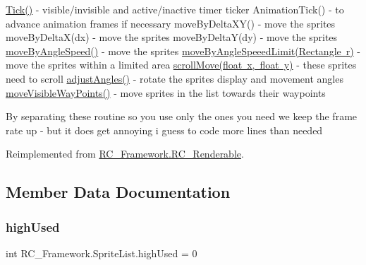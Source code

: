 \mbox{\hyperlink{class_r_c___framework_1_1_sprite_list_af36a07386a5b0f32a74473890868b3fc}{Tick()}} -\/ visible/invisible and active/inactive timer ticker Animation\+Tick() -\/ to advance animation frames if necessary move\+By\+Delta\+X\+Y() -\/ move the sprites move\+By\+Delta\+X(dx) -\/ move the sprites move\+By\+Delta\+Y(dy) -\/ move the sprites \mbox{\hyperlink{class_r_c___framework_1_1_sprite_list_a5467136da9d231b4e99444adb5f52470}{move\+By\+Angle\+Speed()}} -\/ move the sprites \mbox{\hyperlink{class_r_c___framework_1_1_sprite_list_a1ad88a094e1efbdd75de18f8f1d49db1}{move\+By\+Angle\+Speeed\+Limit(\+Rectangle r)}} -\/ move the sprites within a limited area \mbox{\hyperlink{class_r_c___framework_1_1_sprite_list_ac4dbeb822b300bdcbebeb20c15b7bc9a}{scroll\+Move(float x, float y)}} -\/ these sprites need to scroll \mbox{\hyperlink{class_r_c___framework_1_1_sprite_list_a91c1c36f7a1b321e6a1351fddd9c7e3e}{adjust\+Angles()}} -\/ rotate the sprites display and movement angles \mbox{\hyperlink{class_r_c___framework_1_1_sprite_list_a2f4c60ffbdb1ed918079bb2572b0dcf5}{move\+Visible\+Way\+Points()}} -\/ move sprites in the list towards their waypoints

By separating these routine so you use only the ones you need we keep the frame rate up -\/ but it does get annoying i guess to code more lines than needed

Reimplemented from \mbox{\hyperlink{class_r_c___framework_1_1_r_c___renderable_a5745bedc7ba0587aa1e1d8563c357228}{R\+C\+\_\+\+Framework.\+R\+C\+\_\+\+Renderable}}.



\subsection{Member Data Documentation}
\mbox{\label{class_r_c___framework_1_1_sprite_list_acba70858abae8afe358df8fe61c8c394}} 
\subsubsection{\texorpdfstring{high\+Used}{highUsed}}
{\footnotesize\ttfamily int R\+C\+\_\+\+Framework.\+Sprite\+List.\+high\+Used = 0}



